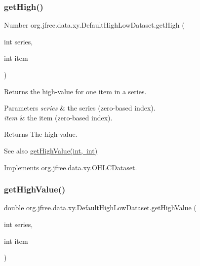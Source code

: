 \subsubsection{\texorpdfstring{get\+High()}{getHigh()}}
{\footnotesize\ttfamily Number org.\+jfree.\+data.\+xy.\+Default\+High\+Low\+Dataset.\+get\+High (\begin{DoxyParamCaption}\item[{int}]{series,  }\item[{int}]{item }\end{DoxyParamCaption})}

Returns the high-\/value for one item in a series.


\begin{DoxyParams}{Parameters}
{\em series} & the series (zero-\/based index). \\
\hline
{\em item} & the item (zero-\/based index).\\
\hline
\end{DoxyParams}
\begin{DoxyReturn}{Returns}
The high-\/value.
\end{DoxyReturn}
\begin{DoxySeeAlso}{See also}
\mbox{\hyperlink{classorg_1_1jfree_1_1data_1_1xy_1_1_default_high_low_dataset_a00f2b176d8247829325f711fca2af339}{get\+High\+Value(int, int)}} 
\end{DoxySeeAlso}


Implements \mbox{\hyperlink{interfaceorg_1_1jfree_1_1data_1_1xy_1_1_o_h_l_c_dataset_a03f647b09b1a04ae0c2eb2bc5116d4d4}{org.\+jfree.\+data.\+xy.\+O\+H\+L\+C\+Dataset}}.

\mbox{\label{classorg_1_1jfree_1_1data_1_1xy_1_1_default_high_low_dataset_a00f2b176d8247829325f711fca2af339}} 
\subsubsection{\texorpdfstring{get\+High\+Value()}{getHighValue()}}
{\footnotesize\ttfamily double org.\+jfree.\+data.\+xy.\+Default\+High\+Low\+Dataset.\+get\+High\+Value (\begin{DoxyParamCaption}\item[{int}]{series,  }\item[{int}]{item }\end{DoxyParamCaption})}

